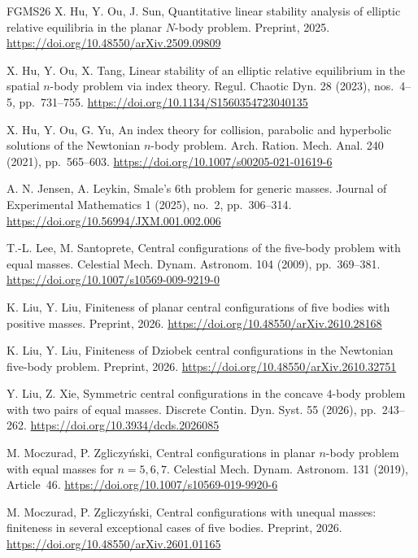 \documentclass[Threeside,11pt]{article}
\theoremstyle{definition}
\theoremstyle{remark}
\numberwithin{equation}{section}
\theoremstyle{remark}
\begin{document}
\begin{thebibliography}{FGMS26}
X. Hu, Y. Ou, J. Sun,
Quantitative linear stability analysis of elliptic
relative equilibria in the planar $N$-body problem.
Preprint, 2025.
\url{https://doi.org/10.48550/arXiv.2509.09809}

X. Hu, Y. Ou, X. Tang,
Linear stability of an elliptic relative equilibrium
in the spatial $n$-body problem via index theory.
Regul. Chaotic Dyn. 28 (2023), nos.~4--5, pp.~731--755.
\url{https://doi.org/10.1134/S1560354723040135}

X. Hu, Y. Ou, G. Yu,
An index theory for collision, parabolic and hyperbolic
solutions of the Newtonian $n$-body problem.
Arch. Ration. Mech. Anal. 240 (2021), pp.~565--603.
\url{https://doi.org/10.1007/s00205-021-01619-6}

A. N. Jensen, A. Leykin,
Smale's 6th problem for generic masses.
Journal of Experimental Mathematics 1 (2025), no.~2, pp.~306--314.
\url{https://doi.org/10.56994/JXM.001.002.006}

T.-L. Lee, M. Santoprete,
Central configurations of the five-body problem with equal
masses.
Celestial Mech. Dynam. Astronom. 104 (2009), pp.~369--381.
\url{https://doi.org/10.1007/s10569-009-9219-0}

K. Liu, Y. Liu,
Finiteness of planar central configurations of five bodies
with positive masses.
Preprint, 2026.
\url{https://doi.org/10.48550/arXiv.2610.28168}

K. Liu, Y. Liu,
Finiteness of Dziobek central configurations in the
Newtonian five-body problem.
Preprint, 2026.
\url{https://doi.org/10.48550/arXiv.2610.32751}

Y. Liu, Z. Xie,
Symmetric central configurations in the concave $4$-body problem with two pairs of equal masses.
Discrete Contin. Dyn. Syst. 55 (2026), pp.~243--262.
\url{https://doi.org/10.3934/dcds.2026085}

M. Moczurad, P. Zgliczy\'nski,
Central configurations in planar $n$-body problem with
equal masses for $n=5,6,7$.
Celestial Mech. Dynam. Astronom. 131 (2019), Article~46.
\url{https://doi.org/10.1007/s10569-019-9920-6}

M. Moczurad, P. Zgliczy\'nski,
Central configurations with unequal masses: finiteness
in several exceptional cases of five bodies.
Preprint, 2026.
\url{https://doi.org/10.48550/arXiv.2601.01165}


\end{thebibliography}
\end{document}
